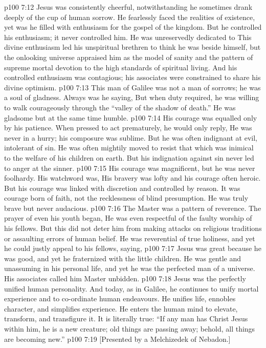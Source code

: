 \vs p100 7:12 Jesus was consistently cheerful, notwithstanding he sometimes drank deeply of the cup of human sorrow. He fearlessly faced the realities of existence, yet was he filled with enthusiasm for the gospel of the kingdom. But he controlled his enthusiasm; it never controlled him. He was unreservedly dedicated to  This divine enthusiasm led his unspiritual brethren to think he was beside himself, but the onlooking universe appraised him as the model of sanity and the pattern of supreme mortal devotion to the high standards of spiritual living. And his controlled enthusiasm was contagious; his associates were constrained to share his divine optimism.
\vs p100 7:13 This man of Galilee was not a man of sorrows; he was a soul of gladness. Always was he saying,  But when duty required, he was willing to walk courageously through the “valley of the shadow of death.” He was gladsome but at the same time humble.
\vs p100 7:14 His courage was equalled only by his patience. When pressed to act prematurely, he would only reply,  He was never in a hurry; his composure was sublime. But he was often indignant at evil, intolerant of sin. He was often mightily moved to resist that which was inimical to the welfare of his children on earth. But his indignation against sin never led to anger at the sinner.
\vs p100 7:15 His courage was magnificent, but he was never foolhardy. His watchword was,  His bravery was lofty and his courage often heroic. But his courage was linked with discretion and controlled by reason. It was courage born of faith, not the recklessness of blind presumption. He was truly brave but never audacious.
\vs p100 7:16 The Master was a pattern of reverence. The prayer of even his youth began,  He was even respectful of the faulty worship of his fellows. But this did not deter him from making attacks on religious traditions or assaulting errors of human belief. He was reverential of true holiness, and yet he could justly appeal to his fellows, saying, 
\vs p100 7:17 Jesus was great because he was good, and yet he fraternized with the little children. He was gentle and unassuming in his personal life, and yet he was the perfected man of a universe. His associates called him Master unbidden.
\vs p100 7:18 Jesus was the perfectly unified human personality. And today, as in Galilee, he continues to unify mortal experience and to co\hyp{}ordinate human endeavours. He unifies life, ennobles character, and simplifies experience. He enters the human mind to elevate, transform, and transfigure it. It is literally true: “If any man has Christ Jesus within him, he is a new creature; old things are passing away; behold, all things are becoming new.”
\vsetoff
\vs p100 7:19 [Presented by a Melchizedek of Nebadon.]

